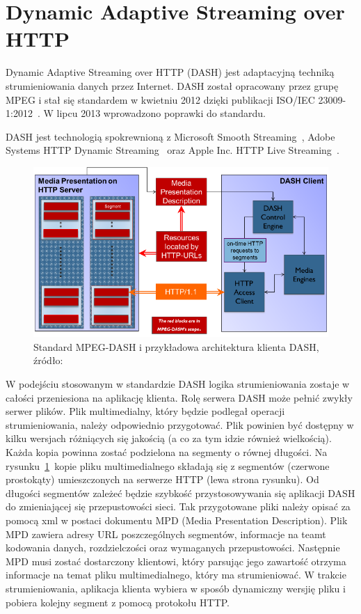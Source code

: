 \section{Dynamic Adaptive Streaming over HTTP}

Dynamic Adaptive Streaming over HTTP (DASH) jest adaptacyjną techniką strumieniowania danych przez Internet. DASH został opracowany przez grupę MPEG i stał się standardem w kwietniu 2012 dzięki publikacji ISO/IEC 23009-1:2012~\cite{ISO-IEC-DASH}. W lipcu 2013 wprowadzono poprawki do standardu.

DASH jest technologią spokrewnioną z Microsoft Smooth Streaming~\cite{MicroS}, Adobe Systems HTTP Dynamic Streaming~\cite{ADOBES} oraz Apple Inc. HTTP Live Streaming~\cite{APPLES}.

\begin{figure}[h!]
	\centering
		\includegraphics{dash}
	\caption{Standard MPEG-DASH i przykładowa architektura klienta DASH, źródło:~\cite{DASH}}
	\label{dash}
\end{figure}

W podejściu stosowanym w standardzie DASH logika strumieniowania zostaje w całości przeniesiona na aplikację klienta. Rolę serwera DASH może pełnić zwykły serwer plików. Plik multimedialny, który będzie podlegał operacji strumieniowania, należy odpowiednio przygotować. Plik powinien być dostępny w kilku wersjach różniących się jakością (a co za tym idzie również wielkością).  Każda kopia powinna zostać podzielona na segmenty o równej długości. Na rysunku~\ref{dash}~kopie pliku multimedialnego składają się z segmentów (czerwone prostokąty) umieszczonych na serwerze HTTP (lewa strona rysunku). Od długości segmentów zależeć będzie szybkość przystosowywania się aplikacji DASH do zmieniającej się przepustowości sieci. Tak przygotowane pliki należy opisać za pomocą xml w postaci dokumentu MPD (Media Presentation Description). Plik MPD zawiera adresy URL poszczególnych segmentów, informacje na teamt kodowania danych, rozdzielczości oraz wymaganych przepustowości. Następnie MPD musi zostać dostarczony klientowi, który parsując jego zawartość otrzyma informacje na temat pliku multimedialnego, który ma strumieniować. W trakcie strumieniowania, aplikacja klienta wybiera w sposób dynamiczny wersjię pliku i pobiera kolejny segment z pomocą protokołu HTTP. 

